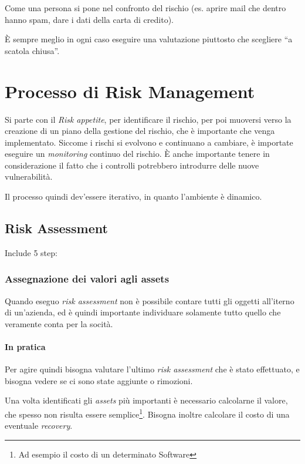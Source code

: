 Come una persona si pone nel confronto del rischio (es. aprire mail che dentro hanno spam, dare i dati della carta di credito).

È sempre meglio in ogni caso eseguire una valutazione piuttosto che scegliere ``a scatola chiusa''.


\section{Processo di Risk Management}

Si parte con il \textit{Risk appetite}, per identificare il rischio, per poi muoversi verso la creazione di un piano della gestione del rischio, che è importante che venga implementato. Siccome i rischi si evolvono e continuano a cambiare, è importate eseguire un \textit{monitoring} continuo del rischio. È anche importante tenere in considerazione il fatto che i controlli potrebbero introdurre delle nuove vulnerabilità. 

Il processo quindi dev'essere iterativo, in quanto l'ambiente è dinamico.


\subsection{Risk Assessment}
Include 5 step:

\subsubsection{Assegnazione dei valori agli assets}

Quando eseguo \textit{risk assessment} non è possibile contare tutti gli oggetti all'iterno di un'azienda, ed è quindi importante individuare solamente tutto quello che veramente conta per la socità.

\paragraph*{In pratica}

Per agire quindi bisogna valutare l'ultimo \textit{risk assessment} che è stato effettuato, e bisogna vedere se ci sono state aggiunte o rimozioni.

Una volta identificati gli \textit{assets} più importanti è necessario calcolarne il valore, che spesso non risulta essere semplice\footnote{Ad esempio il costo di un determinato Software}. Bisogna inoltre calcolare il costo di una eventuale \textit{recovery}.



